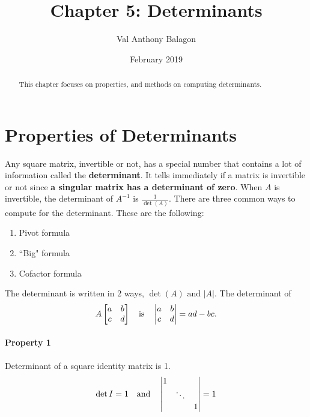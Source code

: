 \documentclass[12pt, letterpaper]{article}
\author{Val Anthony Balagon}
\date{February 2019}
\title{Chapter 5: Determinants}
\theoremstyle{definition}
\begin{document}
	\maketitle
	\begin{abstract}
		This chapter focuses on properties, and methods on computing determinants.
	\end{abstract}

\section{Properties of Determinants}
	Any square matrix, invertible or not, has a special number that contains a lot of information called the \textbf{determinant}. It tells immediately if a matrix is invertible or not since \textbf{a singular matrix has a determinant of zero}. When $A$ is invertible, the determinant of $A^{-1}$ is $\frac{1}{\det(A)}$. There are three common ways to compute for the determinant. These are the following:
	
		{\centering
			\begin{enumerate}
				\item Pivot formula
				\item ``Big" formula
				\item Cofactor formula
		\end{enumerate}}
	
	\noindent The determinant is written in 2 ways, $\det(A) \text{ and } |A|$. The determinant of \[A \begin{bmatrix} a & b \\ c & d \end{bmatrix} \text{\quad is\quad} \begin{vmatrix}a & b \\ c & d\end{vmatrix} = ad - bc.\]
	
\paragraph{Property 1}
Determinant of a square identity matrix is 1.
	\[\det{I} = 1 \text{\quad and\quad} \begin{vmatrix}
									1   &   & \\
									& \ddots& \\
									&       & 1 
								\end{vmatrix} = 1\]
\end{document}
